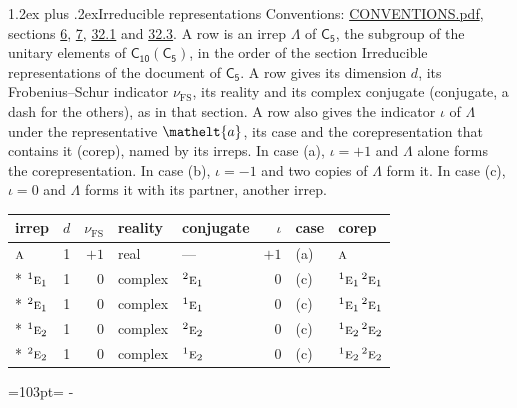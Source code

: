 \documentclass[10pt,a4paper]{article}
\makeatletter
\renewcommand\section{\@startsection{section}{1}{\z@}{-3ex plus -1ex minus -.2ex}%
  {1.2ex plus .2ex}{\normalfont\large\sffamily\bfseries\color{parttitle}}}
\newcommand{\needspace}[1]{\par\penalty-100\begingroup\dimen0=#1\relax\dimen2=\pagegoal
  \advance\dimen2-\pagetotal\ifdim\dimen0>\dimen2\relax\ifdim\dimen2>0pt\vfil\break\fi\fi
  \endgroup}
\numberwithin{equation}{section}
\newcommand{\eltfont}[1]{{\let\sigma\eltsigma\mathelt{#1}}}
\newcommand{\grp}[1]{\mathsf{#1}}
\newcommand{\irr}[1]{\text{\normalfont\scshape #1}}
\newcommand{\conjpair}[1]{{}^{#1}}
\newcommand{\elt}[1]{\eltfont{#1}}
\newcommand{\fsind}{\nu_{\mathrm{FS}}}
\makeatother
\begin{document}
\section{Irreducible representations}\label{s:irreps}
Conventions: \href{../../CONVENTIONS.pdf}{CONVENTIONS.pdf}, sections \href{../../../rotation/CONVENTIONS.pdf\#conv.6}{6}, \href{../../../rotation/CONVENTIONS.pdf\#conv.7}{7}, \href{../../CONVENTIONS.pdf\#conv.32.1}{32.1} and \href{../../CONVENTIONS.pdf\#conv.32.3}{32.3}.
\leavevmode\label{n:irrep.Delta}A row is an irrep $\Lambda$ of $\grp{C_{5}}$, the subgroup of the unitary elements of $\grp{C_{10}}(\grp{C_{5}})$, in the order of the section Irreducible representations of the document of \href{../../../rotation/data/pdf/C5.pdf}{$\grp{C_{5}}$}. \label{n:index.dimension}\label{n:index.frobenius}\label{n:head.irrep}\label{n:head.reality}\label{n:head.conjugate}A row gives its dimension $d$, its Frobenius--Schur indicator $\fsind$, its reality and its complex conjugate (conjugate, a dash for the others), as in that section. \label{n:head.case.corep}\label{n:head.corep}A row also gives the indicator $\iota$ of $\Lambda$ under the representative $\elt{a}$, its case and the corepresentation that contains it (corep), named by its irreps. In case (a), $\iota = +1$ and $\Lambda$ alone forms the corepresentation. In case (b), $\iota = -1$ and two copies of $\Lambda$ form it. In case (c), $\iota = 0$ and $\Lambda$ forms it with its partner, another irrep.
\setlength{\emergencystretch}{2em}\par\setlength{\emergencystretch}{0pt}
{\small\renewcommand{\arraystretch}{1.25}\setlength{\tabcolsep}{4pt}\begin{longtable}{@{}lrrllrll@{}}\toprule
irrep & $d$ & $\fsind$ & reality & conjugate & $\iota$ & case & corep\\\midrule\endhead
\bottomrule\endfoot\endlastfoot
$\irr{a}$ & 1 & $+1$ & real & --- & $+1$ & (a) & $\irr{a}$\\*
$\conjpair{1}\irr{e}_{1}$ & 1 & $0$ & complex & $\conjpair{2}\irr{e}_{1}$ & $0$ & (c) & $\conjpair{1}\irr{e}_{1}\,\conjpair{2}\irr{e}_{1}$\\*
$\conjpair{2}\irr{e}_{1}$ & 1 & $0$ & complex & $\conjpair{1}\irr{e}_{1}$ & $0$ & (c) & $\conjpair{1}\irr{e}_{1}\,\conjpair{2}\irr{e}_{1}$\\*
$\conjpair{1}\irr{e}_{2}$ & 1 & $0$ & complex & $\conjpair{2}\irr{e}_{2}$ & $0$ & (c) & $\conjpair{1}\irr{e}_{2}\,\conjpair{2}\irr{e}_{2}$\\*
$\conjpair{2}\irr{e}_{2}$ & 1 & $0$ & complex & $\conjpair{1}\irr{e}_{2}$ & $0$ & (c) & $\conjpair{1}\irr{e}_{2}\,\conjpair{2}\irr{e}_{2}$\\
\bottomrule\end{longtable}}
\needspace{103pt}
\end{document}
